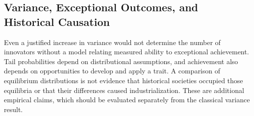 \subsection{Variance, Exceptional Outcomes, and Historical Causation}
Even a justified increase in variance would not determine the number of
innovators without a model relating measured ability to exceptional
achievement. Tail probabilities depend on distributional assumptions,
and achievement also depends on opportunities to develop and apply a
trait. A comparison of equilibrium distributions is not evidence that
historical societies occupied those equilibria or that their differences
caused industrialization. These are additional empirical claims, which
should be evaluated separately from the classical variance result.
